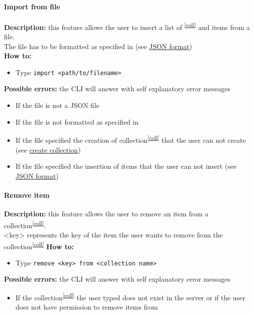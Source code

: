 \documentclass{scalatekids-article}
\begin{document}
\paragraph{Import from file}
\label{sec:import}
\textbf{Description:} this feature allows the user to insert a list of \textsuperscript{\ref{coll}} and items from a file.\\
The file has to be formatted as specified in (see \hyperref[sec:JSONFormat]{JSON format})\\%
\textbf{How to:}
\begin{itemize}
\item Type \texttt{import <path/to/filename>}
\end{itemize}
\textbf{Possible errors:} the CLI will answer with self explanatory error messages
\begin{itemize}
\item If the file is not a JSON file
\item If the file is not formatted as specified in %
\item If the file specified the creation of collection\textsuperscript{\ref{coll}} that the user can not create (see \hyperref[sec:createcollection]{create collection})
\item If the file specified the insertion of items that the user can not insert (see \hyperref[sec:JSONFormat]{JSON format})
\end{itemize}

\paragraph{Remove item}
\label{sec:removeitem}
\textbf{Description:} this feature allows the user to remove an item from a collection\textsuperscript{\ref{coll}}.\\
<key> represents the key of the item the user wants to remove from the collection\textsuperscript{\ref{coll}}
\textbf{How to:}
\begin{itemize}
\item Type \texttt{remove <key> from <collection name>}
\end{itemize}
\textbf{Possible errors:} the CLI will answer with self explanatory error messages
\begin{itemize}
\item If the collection\textsuperscript{\ref{coll}} the user typed does not exist in the server or if the user does not have permission to remove items from
\end{itemize}
\end{document}
